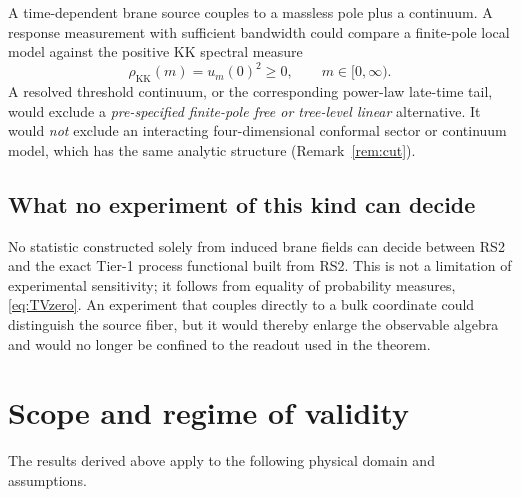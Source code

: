 \documentclass[11pt,a4paper]{article}
\theoremstyle{plain}
\theoremstyle{definition}
\newcommand{\KK}{\mathrm{KK}}
\begin{document}
A time-dependent brane source couples to a massless pole plus a
continuum. A response measurement with sufficient bandwidth could compare
a finite-pole local model against the positive KK spectral measure
\begin{equation}
\label{eq:rhoKK}
\rho_{\KK}(m)=u_m(0)^2\ge0,
\qquad m\in[0,\infty).
\end{equation}
A resolved threshold continuum, or the corresponding power-law late-time
tail, would exclude a \emph{pre-specified finite-pole free or tree-level
linear} alternative. It would \emph{not} exclude an interacting
four-dimensional conformal sector or continuum model, which has the same
analytic structure (Remark~\ref{rem:cut}).

\subsection{What no experiment of this kind can decide}

No statistic constructed solely from induced brane fields can decide
between RS2 and the exact Tier-1 process functional built from RS2. This
is not a limitation of experimental sensitivity; it follows from equality
of probability measures, \eqref{eq:TVzero}. An experiment that couples
directly to a bulk coordinate could distinguish the source fiber, but it
would thereby enlarge the observable algebra and would no longer be
confined to the readout used in the theorem.

\section{Scope and regime of validity}
\label{sec:failure}

The results derived above apply to the following physical domain and
assumptions.
\end{document}
